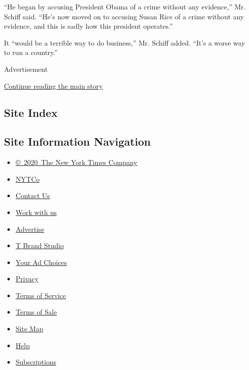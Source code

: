 ``He began by accusing President Obama of a crime without any
evidence,'' Mr. Schiff said. ``He's now moved on to accusing Susan Rice
of a crime without any evidence, and this is sadly how this president
operates.''

It ``would be a terrible way to do business,'' Mr. Schiff added. ``It's
a worse way to run a country.''

Advertisement

\protect\hyperlink{after-bottom}{Continue reading the main story}

\hypertarget{site-index}{%
\subsection{Site Index}\label{site-index}}

\hypertarget{site-information-navigation}{%
\subsection{Site Information
Navigation}\label{site-information-navigation}}

\begin{itemize}
\tightlist
\item
  \href{https://help.nytimes3xbfgragh.onion/hc/en-us/articles/115014792127-Copyright-notice}{©~2020~The
  New York Times Company}
\end{itemize}

\begin{itemize}
\tightlist
\item
  \href{https://www.nytco.com/}{NYTCo}
\item
  \href{https://help.nytimes3xbfgragh.onion/hc/en-us/articles/115015385887-Contact-Us}{Contact
  Us}
\item
  \href{https://www.nytco.com/careers/}{Work with us}
\item
  \href{https://nytmediakit.com/}{Advertise}
\item
  \href{http://www.tbrandstudio.com/}{T Brand Studio}
\item
  \href{https://www.nytimes3xbfgragh.onion/privacy/cookie-policy\#how-do-i-manage-trackers}{Your
  Ad Choices}
\item
  \href{https://www.nytimes3xbfgragh.onion/privacy}{Privacy}
\item
  \href{https://help.nytimes3xbfgragh.onion/hc/en-us/articles/115014893428-Terms-of-service}{Terms
  of Service}
\item
  \href{https://help.nytimes3xbfgragh.onion/hc/en-us/articles/115014893968-Terms-of-sale}{Terms
  of Sale}
\item
  \href{https://spiderbites.nytimes3xbfgragh.onion}{Site Map}
\item
  \href{https://help.nytimes3xbfgragh.onion/hc/en-us}{Help}
\item
  \href{https://www.nytimes3xbfgragh.onion/subscription?campaignId=37WXW}{Subscriptions}
\end{itemize}
